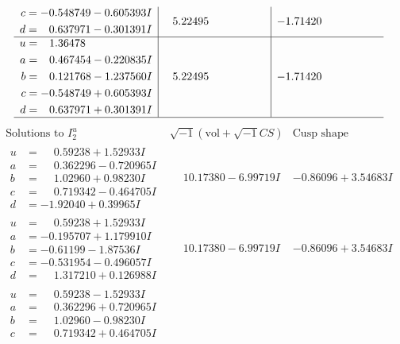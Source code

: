\documentclass[1p]{elsarticle_modified}
\theoremstyle{definition}
\newcommand{\I}{\sqrt{-1}}
\begin{document}
$$\begin{array}{c|c|c}
\begin{aligned}
c &= -0.548749 - 0.605393 I \\
d &= \phantom{-}0.637971 - 0.301391 I\end{aligned}
 & \phantom{-}5.22495\phantom{ +0.000000I} & -1.71420\phantom{ +0.000000I} \\ \hline\begin{aligned}
u &= \phantom{-}1.36478\phantom{ +0.000000I} \\
a &= \phantom{-}0.467454 - 0.220835 I \\
b &= \phantom{-}0.121768 - 1.237560 I \\
c &= -0.548749 + 0.605393 I \\
d &= \phantom{-}0.637971 + 0.301391 I\end{aligned}
 & \phantom{-}5.22495\phantom{ +0.000000I} & -1.71420\phantom{ +0.000000I}\\
 \hline 
 \end{array}$$\newpage$$\begin{array}{c|c|c}  
\text{Solutions to }I^u_{2}& \I (\text{vol} + \sqrt{-1}CS) & \text{Cusp shape}\\
 \hline 
\begin{aligned}
u &= \phantom{-}0.59238 + 1.52933 I \\
a &= \phantom{-}0.362296 - 0.720965 I \\
b &= \phantom{-}1.02960 + 0.98230 I \\
c &= \phantom{-}0.719342 - 0.464705 I \\
d &= -1.92040 + 0.39965 I\end{aligned}
 & \phantom{-}10.17380 - 6.99719 I & -0.86096 + 3.54683 I \\ \hline\begin{aligned}
u &= \phantom{-}0.59238 + 1.52933 I \\
a &= -0.195707 + 1.179910 I \\
b &= -0.61199 - 1.87536 I \\
c &= -0.531954 - 0.496057 I \\
d &= \phantom{-}1.317210 + 0.126988 I\end{aligned}
 & \phantom{-}10.17380 - 6.99719 I & -0.86096 + 3.54683 I \\ \hline\begin{aligned}
u &= \phantom{-}0.59238 - 1.52933 I \\
a &= \phantom{-}0.362296 + 0.720965 I \\
b &= \phantom{-}1.02960 - 0.98230 I \\
c &= \phantom{-}0.719342 + 0.464705 I \\

\end{aligned}
\end{array}$$
\end{document}
